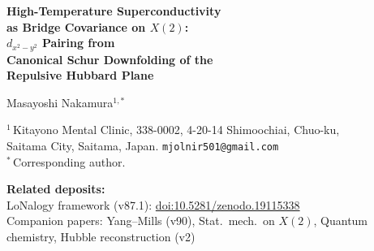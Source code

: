 \documentclass[12pt]{article}
\theoremstyle{plain}
\theoremstyle{definition}
\numberwithin{equation}{section}
\newcommand{\br}{\mathrm{br}}
\DeclareMathOperator{\Cov}{Cov}
\begin{document}
\begin{titlepage}
\centering
\vspace*{0.8cm}
{\LARGE\bfseries High-Temperature Superconductivity\\[6pt]
as Bridge Covariance on $X(2)$:\\[6pt]
$d_{x^2-y^2}$ Pairing from\\[6pt]
Canonical Schur Downfolding of the\\[6pt]
Repulsive Hubbard Plane}
\vspace{1.2cm}

{\large Masayoshi Nakamura$^{1,*}$}
\vspace{0.6cm}

{\normalsize
$^1$\,Kitayono Mental Clinic,
338-0002, 4-20-14 Shimoochiai, Chuo-ku,\\
Saitama City, Saitama, Japan.
\texttt{mjolnir501@gmail.com}\\[4pt]
$^*$\,Corresponding author.
}
\vspace{0.6cm}

{\small
\noindent\textbf{Related deposits:}\\
LoNalogy framework (v87.1):
\href{https://doi.org/10.5281/zenodo.19115338}{doi:10.5281/zenodo.19115338}\\
Companion papers: Yang--Mills (v90), Stat.\ mech.\ on $X(2)$,
Quantum chemistry, Hubble reconstruction (v2)
}
\vspace{0.8cm}

\begin{abstract}
\noindent
The microscopic mechanism of cuprate high-temperature
superconductivity has remained without full consensus for over
30~years.  We show that the LoNalogy canonical bridge
decomposition, applied to the repulsive Hubbard model on the
square lattice, yields a minimal mechanism:
(i)~on-site repulsion $U$ becomes nearest-neighbour singlet bond
attraction $-Jb_{ij}^\dagger b_{ij}$ upon Schur elimination of
the doublon--holon bridge;
(ii)~the pair glue is the bridge covariance
$\mathcal{C}_d^{\br}=\beta\Cov(B_d,B_d)$, not phonons;
(iii)~the leading instability channel is $d_{x^2-y^2}$ by
$C_{4v}$ symmetry and antiferromagnetic sign structure.
A $2\times2$ plaquette benchmark confirms $d$-wave dominance
with matrix elements $|\langle N\!=\!4|\Delta_d^\dagger|N\!=\!2\rangle|
\sim 1.5$--$1.9$ while extended $s$-wave is $\sim10^{-15}$.
\end{abstract}
\end{titlepage}

\setcounter{page}{1}
\tableofcontents
\newpage
\end{document}
